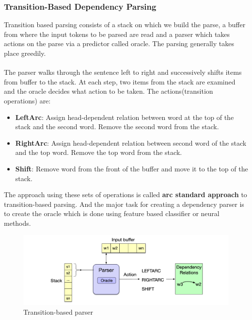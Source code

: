 \subsubsection{Transition-Based Dependency Parsing}
Transition based parsing consists of a stack on which we build the parse, a
buffer from where the input tokens to be parsed are read and a parser which
takes actions on the parse via a predictor called oracle. The parsing generally
takes place greedily.
\\~\\
The parser walks through the sentence left to right and successively shifts
items from buffer to the stack. At each step, two items from the stack are
examined and the oracle decides what action to be taken. The actions(transition
operations) are:
\begin{itemize}
    \item \textbf{LeftArc}: Assign head-dependent relation between word at the top of the stack and the second word. Remove the second word from the stack.
    \item \textbf{RightArc}: Assign head-dependent relation between second word of the stack and the top word. Remove the top word from the stack.
    \item \textbf{Shift}: Remove word from the front of the buffer and move it to the top of the stack.
\end{itemize}
The approach using these sets of operations is called \textbf{arc standard
approach} to transition-based parsing. And the major task for creating a
dependency parser is to create the oracle which is done using feature based
classifier or neural methods.
\begin{figure}[!h]
    \center
    \includegraphics[scale=0.2]{images/transition_based_parser}
    \caption{Transition-based parser\cite{stanfordLec}}
    \label{fig:transition_based_parser}
\end{figure}

